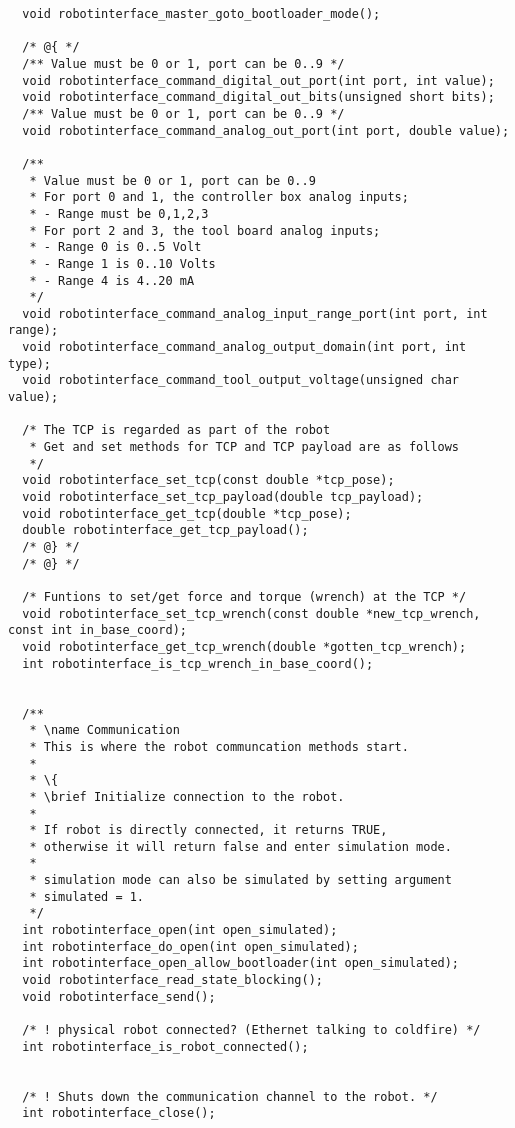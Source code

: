 \documentclass[
a4paper,
12pt,
oneside,
headsepline,		%
footsepline,		%
]{scrbook}
\begin{document}
\begin{lstlisting}
  void robotinterface_master_goto_bootloader_mode();

  /* @{ */
  /** Value must be 0 or 1, port can be 0..9 */
  void robotinterface_command_digital_out_port(int port, int value);
  void robotinterface_command_digital_out_bits(unsigned short bits);
  /** Value must be 0 or 1, port can be 0..9 */
  void robotinterface_command_analog_out_port(int port, double value);

  /**
   * Value must be 0 or 1, port can be 0..9
   * For port 0 and 1, the controller box analog inputs;
   * - Range must be 0,1,2,3
   * For port 2 and 3, the tool board analog inputs;
   * - Range 0 is 0..5 Volt
   * - Range 1 is 0..10 Volts
   * - Range 4 is 4..20 mA
   */
  void robotinterface_command_analog_input_range_port(int port, int range);
  void robotinterface_command_analog_output_domain(int port, int type);
  void robotinterface_command_tool_output_voltage(unsigned char value);

  /* The TCP is regarded as part of the robot
   * Get and set methods for TCP and TCP payload are as follows
   */
  void robotinterface_set_tcp(const double *tcp_pose);
  void robotinterface_set_tcp_payload(double tcp_payload);
  void robotinterface_get_tcp(double *tcp_pose);
  double robotinterface_get_tcp_payload();
  /* @} */
  /* @} */

  /* Funtions to set/get force and torque (wrench) at the TCP */
  void robotinterface_set_tcp_wrench(const double *new_tcp_wrench, const int in_base_coord);
  void robotinterface_get_tcp_wrench(double *gotten_tcp_wrench);
  int robotinterface_is_tcp_wrench_in_base_coord();


  /**
   * \name Communication
   * This is where the robot communcation methods start.
   *
   * \{
   * \brief Initialize connection to the robot.
   *
   * If robot is directly connected, it returns TRUE,
   * otherwise it will return false and enter simulation mode.
   *
   * simulation mode can also be simulated by setting argument
   * simulated = 1.
   */
  int robotinterface_open(int open_simulated);
  int robotinterface_do_open(int open_simulated);
  int robotinterface_open_allow_bootloader(int open_simulated);
  void robotinterface_read_state_blocking();
  void robotinterface_send();

  /* ! physical robot connected? (Ethernet talking to coldfire) */
  int robotinterface_is_robot_connected();


  /* ! Shuts down the communication channel to the robot. */
  int robotinterface_close();



\end{lstlisting}
\end{document}
